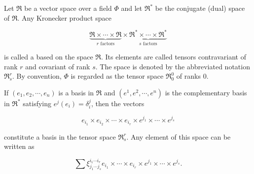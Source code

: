 Let $\Re$ be a vector space over a field $\Phi$ and let $\Re^*$ be the conjugate (dual) space of $\Re$. Any Kronecker product space

$$\underbrace{\Re \times \cdots \times \Re}_{r\text{ factors}} \times \underbrace{\Re^* \times \cdots \times \Re^*}_{s\text{ factors}}$$

is called a  based on the space $\Re$. Its elements are called tensors contravariant of rank $r$ and covariant of rank $s$. The space is denoted by the abbreviated notation $\Re_s^r$. By convention, $\Phi$ is regarded as the tensor space $\Re_0^0$ of ranks $0$.

If $(e_1, e_2, \cdots, e_n)$ is a basis in $\Re$ and $(e^1, e^2, \cdots, e^n)$ is the complementary basis in $\Re^*$ satisfying $e^j(e_i) = \delta_i^j$, then the vectors

$$e_{i_1} \times e_{i_2} \times \cdots \times e_{i_r} \times e^{j_1} \times \cdots \times e^{j_s}$$

constitute a basis in the tensor space $\Re_s^r$. Any element of this space can be written as

$$\sum \xi_{j_1 \cdots j_s}^{i_1 \cdots i_r} e_{i_1} \times \cdots \times e_{i_r} \times e^{j_1} \times \cdots \times e^{j_s}.$$
